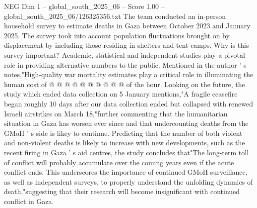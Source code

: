 \begin{textsample}{NEG Dim 1 – global\_south\_2025\_06 – Score 1.00 – global\_south\_2025\_06/126325356.txt}
The team conducted an in-person household survey to estimate deaths in Gaza between October 2023 and January 2025.
The survey took into account population fluctuations brought on by displacement by including those residing in shelters and tent camps.
Why is this survey important?
Academic, statistical and independent studies play a pivotal role in providing alternative numbers to the public.
Mentioned in the author ' s notes,"High-quality war mortality estimates play a critical role in illuminating the human cost of @ @ @ @ @ @ @ @ @ @ of the hour.
Looking on the future, the study which ended data collection on 5 January mentions,"A fragile ceasefire began roughly 10 days after our data collection ended but collapsed with renewed Israeli airstrikes on March 18,"further commenting that the humanitarian situation in Gaza has worsen ever since and that undercounting deaths from the GMoH ' s side is likey to continue.
Predicting that the number of both violent and non-violent deaths is likely to increase with new developments, such as the recent firing in Gaza ' s aid centres, the study concludes that"The long-term toll of conflict will probably accumulate over the coming years even if the acute conflict ends.
This underscores the importance of continued GMoH surveillance, as well as independent surveys, to properly understand the unfolding dynamics of death,"suggesting that their research will become insignificant with continued conflict in Gaza.

\end{textsample}
